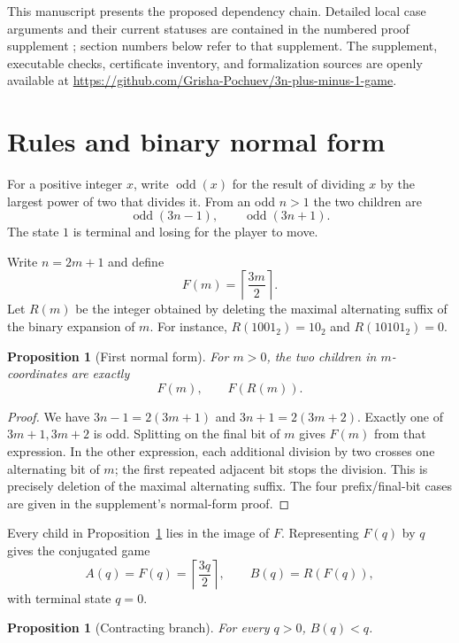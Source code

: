 \documentclass[11pt]{article}
\newtheorem{proposition}[theorem]{Proposition}
\begin{document}
This manuscript presents the proposed dependency chain. Detailed local case
arguments and their current statuses are contained in the numbered proof supplement
\cite{PochuevRepository}; section numbers below refer to that supplement.
The supplement, executable checks, certificate inventory, and formalization
sources are openly available at
\url{https://github.com/Grisha-Pochuev/3n-plus-minus-1-game}.

\section{Rules and binary normal form}

For a positive integer $x$, write $\operatorname{odd}(x)$ for the result of
dividing $x$ by the largest power of two that divides it. From an odd $n>1$
the two children are
\[
  \operatorname{odd}(3n-1),\qquad \operatorname{odd}(3n+1).
\]
The state $1$ is terminal and losing for the player to move.

Write $n=2m+1$ and define
\[
 F(m)=\left\lceil\frac{3m}{2}\right\rceil.
\]
Let $R(m)$ be the integer obtained by deleting the maximal alternating suffix
of the binary expansion of $m$. For instance,
$R(1001_2)=10_2$ and $R(10101_2)=0$.

\begin{proposition}[First normal form]\label{prop:first-normal}
For $m>0$, the two children in $m$-coordinates are exactly
\[
   F(m),\qquad F(R(m)).
\]
\end{proposition}

\begin{proof}
We have $3n-1=2(3m+1)$ and $3n+1=2(3m+2)$. Exactly one of
$3m+1,3m+2$ is odd. Splitting on the final bit of $m$ gives $F(m)$ from
that expression. In the other expression, each additional division by two
crosses one alternating bit of $m$; the first repeated adjacent bit stops the
division. This is precisely deletion of the maximal alternating suffix. The
four prefix/final-bit cases are given in the supplement's normal-form proof.
\end{proof}

Every child in Proposition~\ref{prop:first-normal} lies in the image of $F$.
Representing $F(q)$ by $q$ gives the conjugated game
\[
 A(q)=F(q)=\left\lceil\frac{3q}{2}\right\rceil,
 \qquad B(q)=R(F(q)),
\]
with terminal state $q=0$.

\begin{proposition}[Contracting branch]\label{prop:B-contracts}
For every $q>0$, $B(q)<q$.
\end{proposition}
\end{document}
